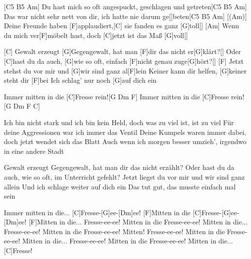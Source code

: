

\begin{guitar}
	[C5 B5 Am] Du hast mich so oft angespuckt, geschlagen und getreten[C5 B5 Am]{}
	Das war nicht sehr nett von dir, ich hatte nie darum ge[]beten[C5 B5 Am]{}
	[(Am)] Deine Freunde haben [F]applaudiert,[C] sie fanden es ganz [G]toll[]{}
	[Am] Wenn du mich ver[F]möbelt hast, doch [C]jetzt ist das Maß [G]voll[]{}

	[C] Gewalt erzeugt [G]Gegengewalt, hat man [F]dir das nicht er[G]klärt?[]{}
	Oder [C]hast du da auch, [G]wie so oft, einfach [F]nicht genau zuge[G]hört?[]{}
	[F] Jetzt stehst du vor mir und [G]wir sind ganz al[F]lein
	Keiner kann dir helfen, [G]keiner steht dir [F]bei
	Ich schlag' nur noch [G]auf dich ein
	
	Immer mitten in die [C]Fresse rein![G Dm F]{}
	Immer mitten in die [C]Fresse rein![G Dm F C]{}
	
	Ich bin nicht stark und ich bin kein Held, doch was zu viel ist, ist zu viel
	Für deine Aggressionen war ich immer das Ventil
	Deine Kumpels waren immer dabei, doch jetzt wendet sich das Blatt
	Auch wenn ich morgen besser umzieh', irgendwo in eine andere Stadt
	
	Gewalt erzeugt Gegengewalt, hat man dir das nicht erzählt?
	Oder hast du da auch, wie so oft, im Unterricht gefehlt?
	Jetzt liegst du vor mir und wir sind ganz allein
	Und ich schlage weiter auf dich ein
	Das tut gut, das musste einfach mal sein
	
	 
	
	Immer mitten in die...
	[C]Fresse-[G]ee-[Dm]ee! [F]Mitten in die [C]Fresse-[G]ee-[Dm]ee! [F]Mitten in die...
	Fresse-ee-ee! Mitten in die Fresse-ee-ee! Mitten in die...
	Fresse-ee-ee! Mitten in die Fresse-ee-ee! Mitten!
	Fresse-ee-ee! Mitten in die Fresse-ee-ee! Mitten in die...
	Fresse-ee-ee! Mitten in die Fresse-ee-ee! Mitten in die...
	[C]Fresse!
\end{guitar}